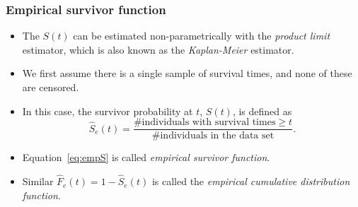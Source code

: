 \documentclass[10pt]{beamer}\usepackage[]{graphicx}\usepackage[]{color}
\newcommand{\empr}[1]{{\emph{\color{red}#1}}}
\begin{document}
\begin{frame}
  \frametitle{Empirical survivor function}
  \begin{itemize}
  \item The $S(t)$ can be estimated non-parametrically with the \empr{product limit} estimator, 
    which is also known as the \empr{Kaplan-Meier} estimator.
  \item We first assume there is a single sample of survival times, 
    and none of these are censored. 
  \item In this case, the survivor probability at $t$, $S(t)$, is defined as 
    \begin{equation}
      \hat S_e(t) = \frac{\mbox{\# individuals with survival times} \ge t}{\mbox{\# individuals in the data set}}.
        \label{eq:empS}
    \end{equation}
  \item Equation~\eqref{eq:empS} is called \empr{empirical survivor function}. 
  \item Similar $\hat F_e(t) = 1 - \hat S_e(t)$ is called the \empr{empirical cumulative distribution function}.
    \end{itemize}
\end{frame}
\end{document}
